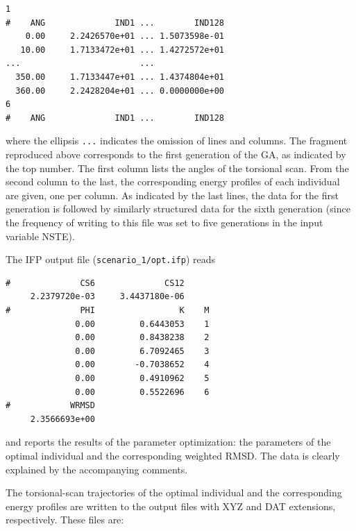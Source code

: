 \documentclass[10pt,a4paper]{report}
\numberwithin{equation}{section}
\newcommand{\under}{\_}
\begin{document}
\begin{lstlisting}
1    
#    ANG              IND1 ...        IND128
    0.00     2.2426570e+01 ... 1.5073598e-01
   10.00     1.7133472e+01 ... 1.4272572e+01
...                        ...
  350.00     1.7133447e+01 ... 1.4374804e+01
  360.00     2.2428204e+01 ... 0.0000000e+00
6
#    ANG              IND1 ...        IND128  
\end{lstlisting}\vspace{-2ex}\par

\noindent where the ellipsis \texttt{...} indicates the omission of lines and
columns.
%
The fragment reproduced above corresponds to the first generation of
the GA, as indicated by the top number.
%
The first column lists the angles of the torsional scan.
%
From the second column to the last, the corresponding energy profiles
of each individual are given, one per column.
%
As indicated by the last lines, the data for the first generation is
followed by similarly structured data for the sixth generation (since
the frequency of writing to this file was set to five generations in
the input variable NSTE).

The IFP output file (\texttt{scenario\under{}1/opt.ifp}) reads

\begin{lstlisting}
#              CS6              CS12
     2.2379720e-03     3.4437180e-06
#              PHI                 K    M
              0.00         0.6443053    1
              0.00         0.8438238    2
              0.00         6.7092465    3
              0.00        -0.7038652    4
              0.00         0.4910962    5
              0.00         0.5522696    6
#            WRMSD
     2.3566693e+00
\end{lstlisting}\vspace{-2ex}\par

\noindent and reports the results of the parameter optimization: the
parameters of the optimal individual and the corresponding weighted
RMSD.
%
The data is clearly explained by the accompanying comments.


The torsional-scan trajectories of the optimal individual and the
corresponding energy profiles are written to the output files with XYZ
and DAT extensions, respectively.
%
These files are:
\end{document}
